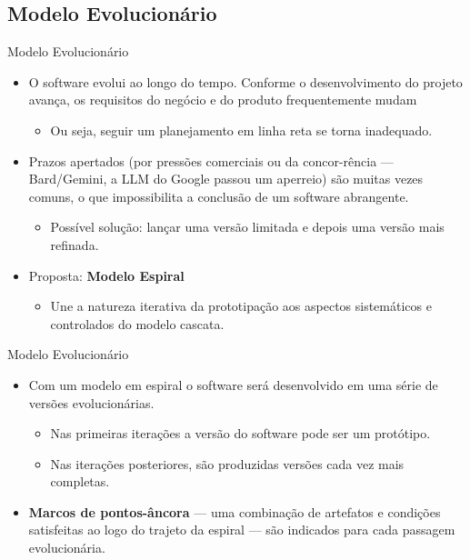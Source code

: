 \documentclass{beamer}
\begin{document}
\subsection{Modelo Evolucionário}

\begin{frame}{Modelo Evolucionário}
	\begin{itemize}
		\justifying
		\item<1> O software evolui ao longo do tempo. Conforme o desenvolvimento do projeto avança, os requisitos do negócio e do produto frequentemente mudam
		\begin{itemize}
			\justifying
			\item<1> Ou seja, seguir um planejamento em linha reta se torna inadequado.
		\end{itemize}
		\item<2> Prazos apertados (por pressões comerciais ou da concor-rência --- Bard/Gemini, a LLM do Google passou um aperreio) são muitas vezes comuns, o que impossibilita a conclusão de um software abrangente.
		\begin{itemize}
			\justifying
			\item<2> Possível solução: lançar uma versão limitada e depois uma versão mais refinada.
		\end{itemize}
		\item<3> Proposta: \textbf{Modelo Espiral}
		\begin{itemize}
			\justifying
			\item<3> Une a natureza iterativa da prototipação aos aspectos sistemáticos e controlados do modelo cascata.
		\end{itemize}
	\end{itemize}
\end{frame}

\begin{frame}{Modelo Evolucionário}
	\begin{itemize}
		\justifying
		\item Com um modelo em espiral o software será desenvolvido em uma série de versões evolucionárias.
		\begin{itemize}
			\justifying
			\item<1> Nas primeiras iterações a versão do software pode ser um protótipo.
			\item<1> Nas iterações posteriores, são produzidas versões cada vez mais completas.
		\end{itemize}
		\item<2> \textbf{Marcos de pontos-âncora} --- uma combinação de artefatos e condições satisfeitas ao logo do trajeto da espiral --- são indicados para cada passagem evolucionária.
	\end{itemize}
\end{frame}
\end{document}
